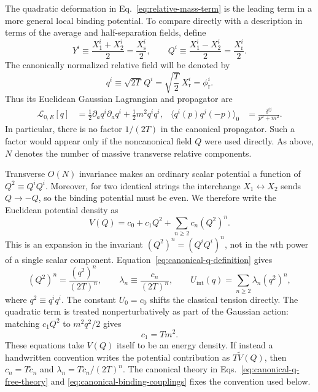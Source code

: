 The quadratic deformation in Eq.~\eqref{eq:relative-mass-term} is the leading
term in a more general local binding potential.  To compare directly with a
description in terms of the average and half-separation fields, define
\begin{equation}
  Y^i\equiv\frac{X_1^i+X_2^i}{2}=\frac{X_{\mathrm s}^i}{2},
  \qquad
  Q^i\equiv\frac{X_1^i-X_2^i}{2}=\frac{X_{\mathrm r}^i}{2}.
  \label{eq:Y-Q-to-sum-relative}
\end{equation}
The canonically normalized relative field will be denoted by
\begin{equation}
  q^i\equiv\sqrt{2T}\,Q^i
  =\sqrt{\frac{T}{2}}\,X_{\mathrm r}^i
  =\phi_{\mathrm r}^i.
  \label{eq:canonical-q-definition}
\end{equation}
Thus its Euclidean Gaussian Lagrangian and propagator are
\begin{align}
  \mathcal L_{0,E}[q]
  &=\frac12\partial_aq^i\partial_aq^i+\frac12m^2q^iq^i,
  &
  \langle q^i(p)q^j(-p)\rangle_0
  &=\frac{\delta^{ij}}{p^2+m^2}.
  \label{eq:canonical-q-free-theory}
\end{align}
In particular, there is no factor $1/(2T)$ in the canonical propagator.  Such
a factor would appear only if the noncanonical field $Q$ were used directly.
As above, $N$ denotes the number of massive transverse relative components.

Transverse $O(N)$ invariance makes an ordinary scalar potential a function of
$Q^2\equiv Q^iQ^i$.  Moreover, for two identical strings the interchange
$X_1\leftrightarrow X_2$ sends $Q\to-Q$, so the binding potential must be even.
We therefore write the Euclidean potential density as
\begin{equation}
  V(Q)=c_0+c_1Q^2+\sum_{n\geq2}c_n(Q^2)^n.
  \label{eq:noncanonical-binding-potential}
\end{equation}
This is an expansion in the invariant $(Q^2)^n=(Q^iQ^i)^n$, not in the
$n$th power of a single scalar component.  Equation~\eqref{eq:canonical-q-definition}
gives
\begin{equation}
  (Q^2)^n=\frac{(q^2)^n}{(2T)^n},
  \qquad
  \lambda_n\equiv\frac{c_n}{(2T)^n},
  \qquad
  U_{\mathrm{int}}(q)=\sum_{n\geq2}\lambda_n(q^2)^n,
  \label{eq:canonical-binding-couplings}
\end{equation}
where $q^2\equiv q^iq^i$.  The constant $U_0=c_0$ shifts the classical
tension directly.  The quadratic term is treated nonperturbatively as part of
the Gaussian action: matching $c_1Q^2$ to $m^2q^2/2$ gives
\begin{equation}
  c_1=Tm^2.
  \label{eq:binding-quadratic-coefficient}
\end{equation}
These equations take $V(Q)$ itself to be an energy density.  If instead a
handwritten convention writes the potential contribution as
$T\widetilde V(Q)$, then $c_n=T\widetilde c_n$ and
$\lambda_n=T\widetilde c_n/(2T)^n$.  The canonical theory in
Eqs.~\eqref{eq:canonical-q-free-theory} and
\eqref{eq:canonical-binding-couplings} fixes the convention used below.

